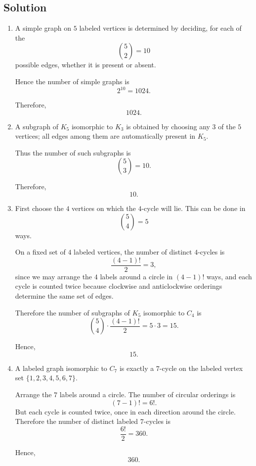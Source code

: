 \documentclass[12pt]{article}
\begin{document}
\subsection{Solution}

\begin{enumerate}[label=(\alph*)]
    \item A simple graph on $5$ labeled vertices is determined by deciding, for each of the
    \[
    \binom{5}{2}=10
    \]
    possible edges, whether it is present or absent.

    Hence the number of simple graphs is
    \[
    2^{10}=1024.
    \]

    Therefore,
    \[
    \boxed{1024}.
    \]

    \item A subgraph of $K_5$ isomorphic to $K_3$ is obtained by choosing any $3$ of the $5$ vertices; all edges among them are automatically present in $K_5$.

    Thus the number of such subgraphs is
    \[
    \binom{5}{3}=10.
    \]

    Therefore,
    \[
    \boxed{10}.
    \]

    \item First choose the $4$ vertices on which the $4$-cycle will lie. This can be done in
    \[
    \binom{5}{4}=5
    \]
    ways.

    On a fixed set of $4$ labeled vertices, the number of distinct $4$-cycles is
    \[
    \frac{(4-1)!}{2}=3,
    \]
    since we may arrange the $4$ labels around a circle in $(4-1)!$ ways, and each cycle is counted twice because clockwise and anticlockwise orderings determine the same set of edges.

    Therefore the number of subgraphs of $K_5$ isomorphic to $C_4$ is
    \[
    \binom{5}{4}\cdot \frac{(4-1)!}{2}=5\cdot 3=15.
    \]

    Hence,
    \[
    \boxed{15}.
    \]

    \item A labeled graph isomorphic to $C_7$ is exactly a $7$-cycle on the labeled vertex set $\{1,2,3,4,5,6,7\}$.

    Arrange the $7$ labels around a circle. The number of circular orderings is
    \[
    (7-1)!=6!.
    \]
    But each cycle is counted twice, once in each direction around the circle. Therefore the number of distinct labeled $7$-cycles is
    \[
    \frac{6!}{2}=360.
    \]

    Hence,
    \[
    \boxed{360}.
    \]
\end{enumerate}
\end{document}
